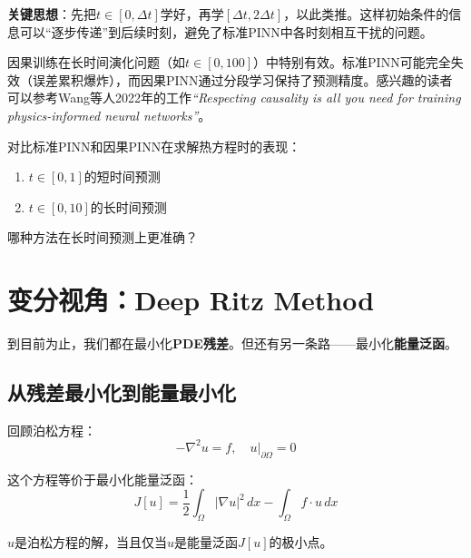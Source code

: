 \textbf{关键思想}：先把$t \in [0, \Delta t]$学好，再学$[\Delta t, 2\Delta t]$，以此类推。这样初始条件的信息可以“逐步传递”到后续时刻，避免了标准PINN中各时刻相互干扰的问题。

\begin{remark}
因果训练在长时间演化问题（如$t \in [0, 100]$）中特别有效。标准PINN可能完全失效（误差累积爆炸），而因果PINN通过分段学习保持了预测精度。感兴趣的读者可以参考Wang等人2022年的工作\textit{“Respecting causality is all you need for training physics-informed neural networks”}。
\end{remark}

\begin{exercise}[title = 因果训练的效果]
对比标准PINN和因果PINN在求解热方程时的表现：
\begin{enumerate}
    \item $t \in [0, 1]$的短时间预测
    \item $t \in [0, 10]$的长时间预测
\end{enumerate}
哪种方法在长时间预测上更准确？
\end{exercise}

\section{变分视角：Deep Ritz Method}

到目前为止，我们都在最小化\textbf{PDE残差}。但还有另一条路——最小化\textbf{能量泛函}。

\subsection{从残差最小化到能量最小化}

回顾泊松方程：
\begin{equation}
    -\nabla^2 u = f, \quad u|_{\partial\Omega} = 0
\end{equation}

这个方程等价于最小化能量泛函：
\begin{equation}
    J[u] = \frac{1}{2}\int_\Omega |\nabla u|^2 \, dx - \int_\Omega f \cdot u \, dx
\end{equation}

\begin{theorem}[能量原理]
$u$是泊松方程的解，当且仅当$u$是能量泛函$J[u]$的极小点。
\end{theorem}

